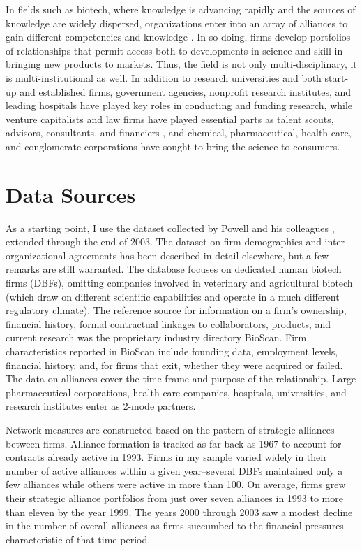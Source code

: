 In fields such as biotech, where knowledge is advancing rapidly and the sources of knowledge are widely dispersed, organizations enter into an array of alliances to gain different competencies and knowledge \citep{powell1996}. In so doing, firms develop portfolios of relationships that permit access both to developments in science and skill in bringing new products to markets. Thus, the field is not only multi-disciplinary, it is multi-institutional as well. In addition to research universities and both start-up and established firms, government agencies, nonprofit research institutes, and leading hospitals have played key roles in conducting and funding research, while venture capitalists and law firms have played essential parts as talent scouts, advisors, consultants, and financiers \citep{gilson1998, lerner1998}, and chemical, pharmaceutical, health-care, and conglomerate corporations have sought to bring the science to consumers.  

\section{Data Sources}

As a starting point, I use the dataset collected by Powell and his colleagues \citep[see e.g.][]{powell2005}, extended through the end of 2003. The dataset on firm demographics and inter-organizational agreements has been described in detail elsewhere, but a few remarks are still warranted. The database focuses on dedicated human biotech firms (DBFs), omitting companies involved in veterinary and agricultural biotech (which draw on different scientific capabilities and operate in a much different regulatory climate).  The reference source for information on a firm's ownership, financial history, formal contractual linkages to collaborators, products, and current research was the proprietary industry directory BioScan. Firm characteristics reported in BioScan include founding data, employment levels, financial history, and, for firms that exit, whether they were acquired or failed. The data on alliances cover the time frame and purpose of the relationship. Large pharmaceutical corporations, health care companies, hospitals, universities, and research institutes enter as 2-mode partners.

Network measures are constructed based on the pattern of strategic alliances between firms. Alliance formation is tracked as far back as 1967 to account for contracts already active in 1993. Firms in my sample varied widely in their number of active alliances within a given year--several DBFs maintained only a few alliances while others were active in more than 100. On average, firms grew their strategic alliance portfolios from just over seven alliances in 1993 to more than eleven by the year 1999. The years 2000 through 2003 saw a modest decline in the number of overall alliances as firms succumbed to the financial pressures characteristic of that time period. 

